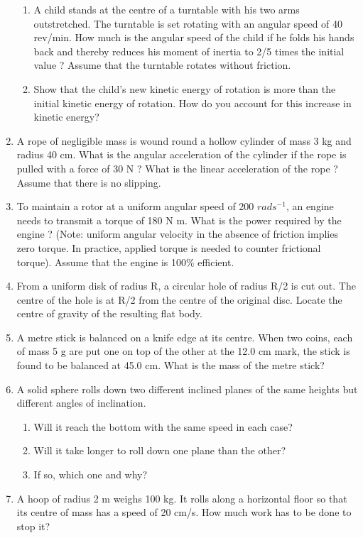 \begin{enumerate}[label=\thesection.\arabic*.,ref=\thesection.\theenumi]
\begin{enumerate}[label=(\alph*)]
\item  A child stands at the centre of a turntable with his two arms outstretched. The turntable is set rotating with an angular speed of 40 rev/min. How much is the angular speed of the child if he folds his hands back and thereby reduces his moment of inertia to 2/5 times the initial value ? Assume that the turntable rotates without friction.
\item Show that the child's new kinetic energy of rotation is more than the initial kinetic energy of rotation. How do you account for this increase in kinetic energy?
\end{enumerate}
\item  A rope of negligible mass is wound round a hollow cylinder of mass 3 kg and radius 40 cm. What is the angular acceleration of the cylinder if the rope is pulled with a force of 30 N ? What is the linear acceleration of the rope ? Assume that there is no slipping.
\item  To maintain a rotor at a uniform angular speed of 200 $rad s^{-1}$, an engine needs to transmit a torque of 180 N m. What is the power required by the engine ? (Note: uniform angular velocity in the absence of friction implies zero torque. In practice, applied torque is needed to counter frictional torque). Assume that the engine is 100\% efficient.
\item  From a uniform disk of radius R, a circular hole of radius R/2 is cut out. The centre of the hole is at R/2 from the centre of the original disc. Locate the centre of gravity of the resulting flat body.
\item  A metre stick is balanced on a knife edge at its centre. When two coins, each of mass 5 g are put one on top of the other at the 12.0 cm mark, the stick is found to be balanced at 45.0 cm. What is the mass of the metre stick?
\item A solid sphere rolls down two different inclined planes of the same heights but different angles of inclination. 
\begin{enumerate}[label=(\alph*)]
\item  Will it reach the bottom with the same speed in each case? 
\item  Will it take longer to roll down one plane than the other? 
\item  If so, which one and why?
\end{enumerate}
\item  A hoop of radius 2 m weighs 100 kg. It rolls along a horizontal floor so that its centre of mass has a speed of 20 cm/s. How much work has to be done to stop it? 

\end{enumerate}
